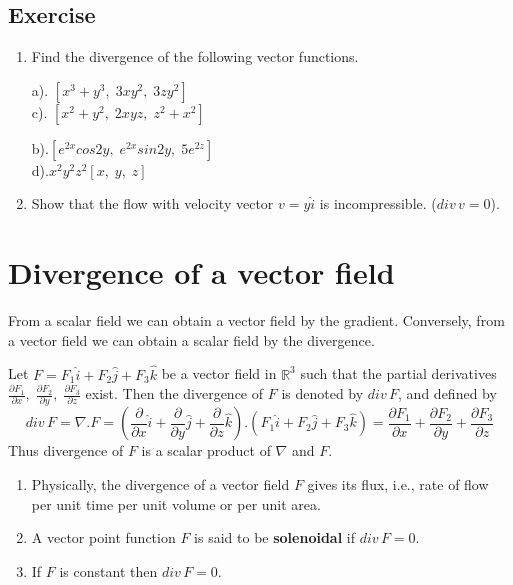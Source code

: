 \documentclass[aima331_lecturenotes_ku.tex]{subfiles}
\begin{document}
  \subsection{Exercise}
\begin{enumerate}
\item Find the divergence of the following vector functions.
\begin{multicols}{2}
  a). $[x^3 + y^3, \; 3xy^2, \; 3zy^2]$ \\[1mm]
  c). $[x^2 + y^2, \; 2xyz, \; z^2+x^2]$
  \columnbreak

  b).$[e^{2x}cos2y, \; e^{2x}sin2y, \; 5e^{2z}]$ \\[1mm]
  d).$x^2y^2z^2[x, \;y, \;z]$
\end{multicols}

\item Show that the flow with velocity vector $v=y\hat{i}$ is incompressible. (\textit{$div \, v = 0$}).
\end{enumerate}

\section{Divergence of a vector field}
From a scalar field we can obtain a vector field by the gradient. Conversely, from a vector field we can obtain a scalar field by the divergence.
\begin{mdframed}
  Let $F=F_1\hat{i} + F_2\hat{j} + F_3\hat{k}$ be a vector field in $\mathbb{R}^3$ such that the partial derivatives $\frac{\partial F_1}{\partial x}, \; \frac{\partial F_2}{\partial y}, \; \frac{\partial F_3}{\partial z}$ exist. Then the divergence of $F$ is denoted by $div\,F$, and defined by $$div \,F = \nabla . F = \left ( \frac{\partial }{\partial x} \hat{i} + \frac{\partial }{\partial y} \hat{j} + \frac{\partial }{\partial z} \hat{k} \right ) . (F_1\hat{i} + F_2\hat{j} + F_3\hat{k}) = \frac{\partial F_1}{\partial x} + \frac{\partial F_2}{\partial y} + \frac{\partial F_3}{\partial z}$$
Thus divergence of $F$ is a scalar product of $\nabla$ and $F$.
\end{mdframed}
\begin{enumerate}
\item Physically, the divergence of a vector field $F$ gives its flux, i.e., rate of flow per unit time per unit volume or per unit area.
\item A vector point function $F$ is said to be \textbf{solenoidal} if $div \, F=0$.
\item If $F$ is constant then $div \,F=0$.
\end{enumerate}
\end{document}
